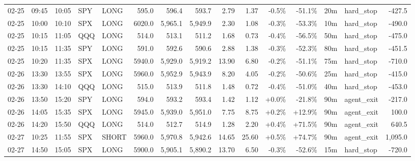 \documentclass[11pt,a4paper,twoside]{article}
\begin{document}
\begin{landscape}
\begin{center}
\begin{longtable}{>{\color{txtmain}}l l l l l r r r r r r r r >{\color{txtmain}}l r}
02-25 & 09:45 & 10:05 & SPY & LONG & 595.0 & 596.4 & 593.7 & 2.79 & 1.37 & \textcolor{lossred}{-0.5\%} & \textcolor{lossred}{-51.1\%} & 20m & hard\_stop & \textcolor{lossred}{-427.5} \\
02-25 & 10:00 & 10:10 & SPX & LONG & 6020.0 & 5,965.1 & 5,949.9 & 2.30 & 1.08 & \textcolor{lossred}{-0.3\%} & \textcolor{lossred}{-53.3\%} & 10m & hard\_stop & \textcolor{lossred}{-490.0} \\
02-25 & 10:15 & 11:05 & QQQ & LONG & 514.0 & 513.1 & 511.2 & 1.68 & 0.73 & \textcolor{lossred}{-0.4\%} & \textcolor{lossred}{-56.5\%} & 50m & hard\_stop & \textcolor{lossred}{-475.0} \\
02-25 & 10:15 & 11:35 & SPY & LONG & 591.0 & 592.6 & 590.6 & 2.88 & 1.38 & \textcolor{lossred}{-0.3\%} & \textcolor{lossred}{-52.3\%} & 80m & hard\_stop & \textcolor{lossred}{-451.5} \\
02-25 & 10:20 & 11:35 & SPX & LONG & 5940.0 & 5,929.0 & 5,919.2 & 13.90 & 6.80 & \textcolor{lossred}{-0.2\%} & \textcolor{lossred}{-51.1\%} & 75m & hard\_stop & \textcolor{lossred}{-710.0} \\
02-26 & 13:30 & 13:55 & SPX & LONG & 5960.0 & 5,952.9 & 5,943.9 & 8.20 & 4.05 & \textcolor{lossred}{-0.2\%} & \textcolor{lossred}{-50.6\%} & 25m & hard\_stop & \textcolor{lossred}{-415.0} \\
02-26 & 13:30 & 14:10 & QQQ & LONG & 515.0 & 513.9 & 511.8 & 1.48 & 0.72 & \textcolor{lossred}{-0.4\%} & \textcolor{lossred}{-51.0\%} & 40m & hard\_stop & \textcolor{lossred}{-453.0} \\
02-26 & 13:50 & 15:20 & SPY & LONG & 594.0 & 593.2 & 593.4 & 1.42 & 1.12 & \textcolor{wingreen}{+0.0\%} & \textcolor{lossred}{-21.8\%} & 90m & agent\_exit & \textcolor{lossred}{-217.0} \\
02-26 & 14:05 & 15:35 & SPX & LONG & 5945.0 & 5,939.0 & 5,951.0 & 7.75 & 8.75 & \textcolor{wingreen}{+0.2\%} & \textcolor{wingreen}{+12.9\%} & 90m & agent\_exit & \textcolor{wingreen}{100.0} \\
02-26 & 14:20 & 15:50 & QQQ & LONG & 514.0 & 512.7 & 514.9 & 1.28 & 2.20 & \textcolor{wingreen}{+0.4\%} & \textcolor{wingreen}{+71.5\%} & 90m & agent\_exit & \textcolor{wingreen}{640.5} \\
02-27 & 10:25 & 11:55 & SPX & SHORT & 5960.0 & 5,970.8 & 5,942.6 & 14.65 & 25.60 & \textcolor{wingreen}{+0.5\%} & \textcolor{wingreen}{+74.7\%} & 90m & agent\_exit & \textcolor{wingreen}{1,095.0} \\
02-27 & 14:50 & 15:05 & SPX & LONG & 5900.0 & 5,905.1 & 5,890.2 & 13.70 & 6.50 & \textcolor{lossred}{-0.3\%} & \textcolor{lossred}{-52.6\%} & 15m & hard\_stop & \textcolor{lossred}{-720.0} \\

\end{longtable}
\end{center}
\end{landscape}
\end{document}
